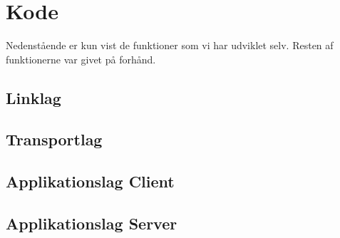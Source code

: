 \chapter{Kode}

Nedenstående er kun vist de funktioner som vi har udviklet selv. Resten af funktionerne var givet på forhånd.

\section{Linklag}

\newpage
\section{Transportlag}

\newpage
\section{Applikationslag Client}

\newpage
\section{Applikationslag Server}

